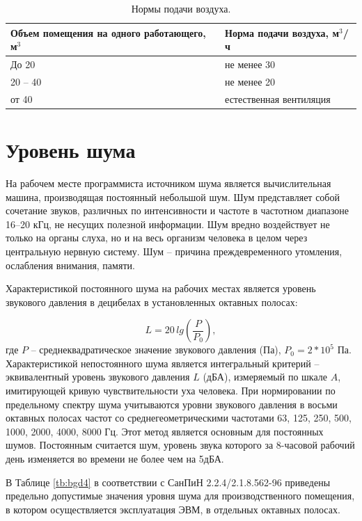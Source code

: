 \documentclass[12pt,a4paper]{report}
\begin{document}
\begin{table}[H]
\begin{center}
\begin{tabular}{|p{5cm}|p{5cm}|}
\hline
Объем помещения на одного работающего, м$^3$  &Норма подачи воздуха,  м$^3$/ч \\
\hline
До 20    &не менее 30\\
20 – 40  &не менее 20\\
от 40    &естественная вентиляция\\
\hline
\end{tabular}
\end{center}
\caption{Нормы подачи воздуха.}
\label{tb:bgd3}
\end{table}

\section{Уровень шума}

На рабочем месте программиста источником шума является вычислительная машина, производящая постоянный небольшой шум. Шум представляет собой сочетание звуков, различных по интенсивности и частоте в частотном диапазоне 16–20 кГц, не несущих полезной информации. Шум вредно воздействует не только на органы слуха, но и на весь организм человека в целом через центральную нервную систему. Шум – причина преждевременного утомления, ослабления внимания, памяти.

Характеристикой постоянного шума на рабочих местах является уровень звукового давления в децибелах в установленных октавных полосах:

$$L = 20 \, lg(\frac{P}{P_0}),$$
где $P$ – среднеквадратическое значение звукового давления (Па), $P_0 = 2*10^5$ Па.
Характеристикой непостоянного шума является интегральный критерий – эквивалентный уровень звукового давления $L$ (дБА), измеряемый по шкале $A$, имитирующей кривую чувствительности уха человека.
При нормировании по предельному спектру шума учитываются уровни звукового давления в восьми октавных полосах частот со среднегеометрическими частотами 63, 125, 250, 500, 1000, 2000, 4000, 8000 Гц. Этот метод является основным для постоянных шумов. Постоянным считается шум, уровень звука которого за 8-часовой рабочий день изменяется во времени не более чем на 5дБА.

В Таблице \ref{tb:bgd4} в соответствии с СанПиН 2.2.4/2.1.8.562-96 \cite{SanPin-Noise} приведены предельно допустимые значения уровня шума для производственного помещения, в котором осуществляется эксплуатация ЭВМ, в отдельных октавных полосах.
\end{document}
